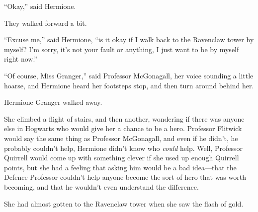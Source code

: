 ``Okay,'' said Hermione.

They walked forward a bit.

``Excuse me,'' said Hermione, ``is it okay if I walk back to the
Ravenclaw tower by myself? I'm sorry, it's not your fault or anything, I
just want to be by myself right now.''

``Of course, Miss Granger,'' said Professor McGonagall, her voice
sounding a little hoarse, and Hermione heard her footsteps stop, and
then turn around behind her.

Hermione Granger walked away.

She climbed a flight of stairs, and then another, wondering if there was
anyone else in Hogwarts who would give her a chance to be a hero.
Professor Flitwick would say the same thing as Professor McGonagall, and
even if he didn't, he probably couldn't help, Hermione didn't know who
\emph{could} help. Well, Professor Quirrell would come up with something
clever if she used up enough Quirrell points, but she had a feeling that
asking him would be a bad idea---that the Defence Professor couldn't
help anyone become the sort of hero that was worth becoming, and that he
wouldn't even understand the difference.

She had almost gotten to the Ravenclaw tower when she saw the flash of
gold.
